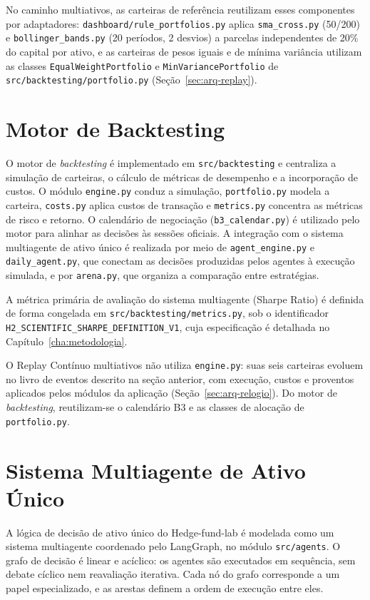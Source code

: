 No caminho multiativos, as carteiras de referência reutilizam esses componentes por adaptadores: \texttt{dashboard/rule\_portfolios.py} aplica \texttt{sma\_cross.py} (50/200) e \texttt{bollinger\_bands.py} (20 períodos, 2 desvios) a parcelas independentes de 20\% do capital por ativo, e as carteiras de pesos iguais e de mínima variância utilizam as classes \texttt{EqualWeightPortfolio} e \texttt{MinVariancePortfolio} de \texttt{src/backtesting/portfolio.py} (Seção~\ref{sec:arq-replay}).

\section{Motor de Backtesting}

O motor de \textit{backtesting} é implementado em \texttt{src/backtesting} e centraliza a simulação de carteiras, o cálculo de métricas de desempenho e a incorporação de custos. O módulo \texttt{engine.py} conduz a simulação, \texttt{portfolio.py} modela a carteira, \texttt{costs.py} aplica custos de transação e \texttt{metrics.py} concentra as métricas de risco e retorno. O calendário de negociação (\texttt{b3\_calendar.py}) é utilizado pelo motor para alinhar as decisões às sessões oficiais. A integração com o sistema multiagente de ativo único é realizada por meio de \texttt{agent\_engine.py} e \texttt{daily\_agent.py}, que conectam as decisões produzidas pelos agentes à execução simulada, e por \texttt{arena.py}, que organiza a comparação entre estratégias.

A métrica primária de avaliação do sistema multiagente (Sharpe Ratio) é definida de forma congelada em \texttt{src/backtesting/metrics.py}, sob o identificador \texttt{H2\_SCIENTIFIC\_SHARPE\_DEFINITION\_V1}, cuja especificação é detalhada no Capítulo~\ref{cha:metodologia}.

O Replay Contínuo multiativos não utiliza \texttt{engine.py}: suas seis carteiras evoluem no livro de eventos descrito na seção anterior, com execução, custos e proventos aplicados pelos módulos da aplicação (Seção~\ref{sec:arq-relogio}). Do motor de \textit{backtesting}, reutilizam-se o calendário B3 e as classes de alocação de \texttt{portfolio.py}.

\section{Sistema Multiagente de Ativo Único}
\label{sec:arq-ativo-unico}

A lógica de decisão de ativo único do Hedge-fund-lab é modelada como um sistema multiagente coordenado pelo LangGraph, no módulo \texttt{src/agents}. O grafo de decisão é linear e acíclico: os agentes são executados em sequência, sem debate cíclico nem reavaliação iterativa. Cada nó do grafo corresponde a um papel especializado, e as arestas definem a ordem de execução entre eles.

